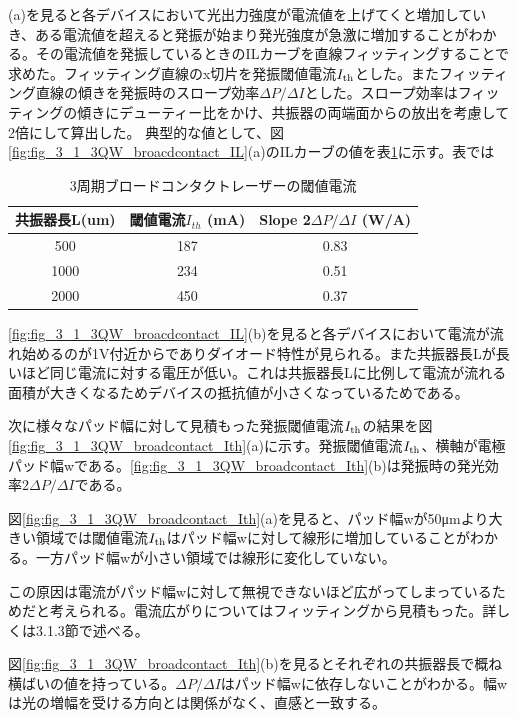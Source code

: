 (a)を見ると各デバイスにおいて光出力強度が電流値を上げてくと増加していき、ある電流値を超えると発振が始まり発光強度が急激に増加することがわかる。その電流値を発振しているときのILカーブを直線フィッティングすることで求めた。フィッティング直線のx切片を発振閾値電流$I_{\rm{th}}$とした。またフィッティング直線の傾きを発振時のスロープ効率$\Delta P/\Delta I$とした。スロープ効率はフィッティングの傾きにデューティー比をかけ、共振器の両端面からの放出を考慮して2倍にして算出した。
典型的な値として、図\ref{fig:fig_3_1_3QW_broacdcontact_IL}(a)のILカーブの値を表\ref{table:table_3_1_3QW_broadcontact}に示す。表では
\begin{table}[h]
  \caption{3周期ブロードコンタクトレーザーの閾値電流}
  \label{table:table_3_1_3QW_broadcontact}
  \centering
  \begin{tabular}{ccc}
    \hline
    共振器長L(um)  & 閾値電流$I_{th}$ (mA)  & Slope 2$\Delta P/\Delta I$ (W/A) \\
    \hline \hline
     500& 187&  0.83  \\
    1000& 234& 0.51\\
    2000& 450&0.37\\
       \hline
  \end{tabular}
\end{table}



\ref{fig:fig_3_1_3QW_broacdcontact_IL}(b)を見ると各デバイスにおいて電流が流れ始めるのが1V付近からでありダイオード特性が見られる。また共振器長Lが長いほど同じ電流に対する電圧が低い。これは共振器長Lに比例して電流が流れる面積が大きくなるためデバイスの抵抗値が小さくなっているためである。


次に様々なパッド幅に対して見積もった発振閾値電流$I_{\rm{th}}$の結果を図\ref{fig:fig_3_1_3QW_broadcontact_Ith}(a)に示す。発振閾値電流$I_{\rm{th}}$、横軸が電極パッド幅wである。\ref{fig:fig_3_1_3QW_broadcontact_Ith}(b)は発振時の発光効率$2 \Delta P/\Delta I$である。

図\ref{fig:fig_3_1_3QW_broadcontact_Ith}(a)を見ると、パッド幅wが50\si{\micro\metre}より大きい領域では閾値電流$I_{\rm{th}}$はパッド幅wに対して線形に増加していることがわかる。一方パッド幅wが小さい領域では線形に変化していない。

この原因は電流がパッド幅wに対して無視できないほど広がってしまっているためだと考えられる。電流広がりについてはフィッティングから見積もった。詳しくは3.1.3節で述べる。

図\ref{fig:fig_3_1_3QW_broadcontact_Ith}(b)を見るとそれぞれの共振器長で概ね横ばいの値を持っている。$\Delta P/\Delta I$はパッド幅wに依存しないことがわかる。幅wは光の増幅を受ける方向とは関係がなく、直感と一致する。

